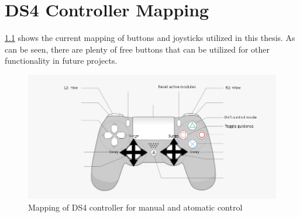 \chapter{DS4 Controller Mapping}

\cref{fig:ds4} shows the current mapping of buttons and joysticks utilized in this thesis. As can be seen, there are plenty of free buttons that can be utilized for other functionality in future projects.
\begin{figure}[H]
    \centering
    \includegraphics[width=\textwidth]{Images/Manual-control-mapping.png}
    \caption{Mapping of DS4 controller for manual and atomatic control}
    \label{fig:ds4}
\end{figure}